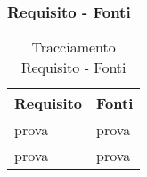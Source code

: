 \subsubsection{Requisito - Fonti}
\begin{table}[h!]
    \centering
    \renewcommand{\arraystretch}{1.6} %
    \begin{tabularx}{0.8\textwidth}{|>{\centering\arraybackslash}p{2.8cm}|>{\centering\arraybackslash}X|} \hline
    \rowcolor[HTML]{FFD700} 
    \textbf{Requisito} & \textbf{Fonti} \\ \hline
    prova & prova \\ \hline
    prova & prova \\ \hline
    \end{tabularx}
    \caption{Tracciamento Requisito - Fonti}
    \label{tab:Tracciamento_requisiti_fonti}
\end{table}